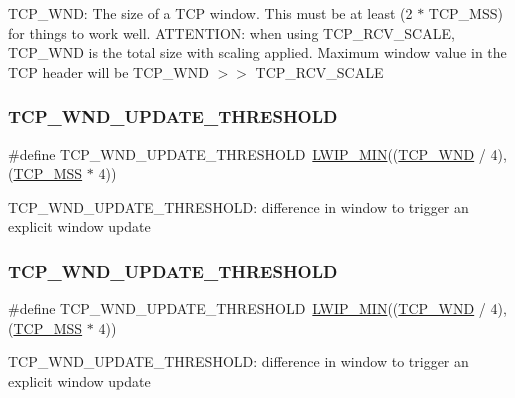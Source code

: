 T\+C\+P\+\_\+\+W\+ND\+: The size of a T\+CP window. This must be at least (2 $\ast$ T\+C\+P\+\_\+\+M\+SS) for things to work well. A\+T\+T\+E\+N\+T\+I\+ON\+: when using T\+C\+P\+\_\+\+R\+C\+V\+\_\+\+S\+C\+A\+LE, T\+C\+P\+\_\+\+W\+ND is the total size with scaling applied. Maximum window value in the T\+CP header will be T\+C\+P\+\_\+\+W\+ND $>$$>$ T\+C\+P\+\_\+\+R\+C\+V\+\_\+\+S\+C\+A\+LE \mbox{\label{group__lwip__opts__tcp_ga5d45732ba3a8438b141096d86e07ef8d}} 
\subsubsection{\texorpdfstring{T\+C\+P\+\_\+\+W\+N\+D\+\_\+\+U\+P\+D\+A\+T\+E\+\_\+\+T\+H\+R\+E\+S\+H\+O\+LD}{TCP\_WND\_UPDATE\_THRESHOLD}\hspace{0.1cm}{\footnotesize\ttfamily [1/2]}}
{\footnotesize\ttfamily \#define T\+C\+P\+\_\+\+W\+N\+D\+\_\+\+U\+P\+D\+A\+T\+E\+\_\+\+T\+H\+R\+E\+S\+H\+O\+LD~\hyperlink{openmote-cc2538_2lwip_2src_2include_2lwip_2def_8h_a748f5df614a3fc989e8900fd229d6e4e}{L\+W\+I\+P\+\_\+\+M\+IN}((\hyperlink{openmote-cc2538_2lwip_2test_2unit_2lwipopts_8h_a7f535a6efb5cdf86c3210e35ece1d6a7}{T\+C\+P\+\_\+\+W\+ND} / 4), (\hyperlink{group__lwip__opts__tcp_gaf1ab7bb27860aa3677c387a2f3ba317b}{T\+C\+P\+\_\+\+M\+SS} $\ast$ 4))}

T\+C\+P\+\_\+\+W\+N\+D\+\_\+\+U\+P\+D\+A\+T\+E\+\_\+\+T\+H\+R\+E\+S\+H\+O\+LD\+: difference in window to trigger an explicit window update \mbox{\label{group__lwip__opts__tcp_ga5d45732ba3a8438b141096d86e07ef8d}} 
\subsubsection{\texorpdfstring{T\+C\+P\+\_\+\+W\+N\+D\+\_\+\+U\+P\+D\+A\+T\+E\+\_\+\+T\+H\+R\+E\+S\+H\+O\+LD}{TCP\_WND\_UPDATE\_THRESHOLD}\hspace{0.1cm}{\footnotesize\ttfamily [2/2]}}
{\footnotesize\ttfamily \#define T\+C\+P\+\_\+\+W\+N\+D\+\_\+\+U\+P\+D\+A\+T\+E\+\_\+\+T\+H\+R\+E\+S\+H\+O\+LD~\hyperlink{openmote-cc2538_2lwip_2src_2include_2lwip_2def_8h_a748f5df614a3fc989e8900fd229d6e4e}{L\+W\+I\+P\+\_\+\+M\+IN}((\hyperlink{openmote-cc2538_2lwip_2test_2unit_2lwipopts_8h_a7f535a6efb5cdf86c3210e35ece1d6a7}{T\+C\+P\+\_\+\+W\+ND} / 4), (\hyperlink{group__lwip__opts__tcp_gaf1ab7bb27860aa3677c387a2f3ba317b}{T\+C\+P\+\_\+\+M\+SS} $\ast$ 4))}

T\+C\+P\+\_\+\+W\+N\+D\+\_\+\+U\+P\+D\+A\+T\+E\+\_\+\+T\+H\+R\+E\+S\+H\+O\+LD\+: difference in window to trigger an explicit window update 